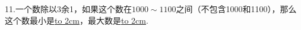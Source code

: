 \question 11.一个数除以3余1，如果这个数在$1000\sim1100$之间（不包含1000和1100），那么这个数最小是\underline{\hbox to 2cm{}}，最大数是\underline{\hbox to 2cm{}}.